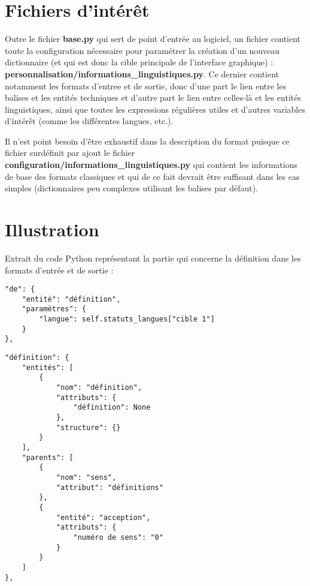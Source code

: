 \documentclass[10pt]{report}
\newcommand{\balise}[1]{\textcolor{red!80}{#1}}
\newcommand{\entité}[1]{\textcolor{blue!60!black}{#1}}
\newcommand{\entitétechnique}[1]{\textcolor{blue!50!red}{#1}}
\begin{document}
\section{Fichiers d’intérêt}

Outre le fichier \textbf{base.py} qui sert de point d’entrée au logiciel, un fichier contient toute la configuration nécessaire pour paramétrer la création d’un nouveau dictionnaire (et qui est donc la cible principale de l’interface graphique) : \textbf{personnalisation/informations\_linguistiques.py}. Ce dernier contient notamment les formats d’entree et de sortie, donc d’une part le lien entre les \balise{balises} et les \entitétechnique{entités techniques} et d’autre part le lien entre \entitétechnique{celles-là} et les \entité{entités linguistiques}, ainsi que toutes les expressions régulières utiles et d’autres variables d’intérêt (comme les différentes langues, etc.).

\bigskip

Il n’est point besoin d’être exhaustif dans la description du format puisque ce fichier surdéfinit par ajout le fichier \textbf{configuration/informations\_linguistiques.py} qui contient les informations de base des formats classiques et qui de ce fait devrait être suffisant dans les cas simples (dictionnaires peu complexes utilisant les balises par défaut).

\section{Illustration}

Extrait du code Python représentant la partie qui concerne la définition dans les formats d’entrée et de sortie :

\begin{verbatim}
"de": {
    "entité": "définition", 
    "paramètres": {
        "langue": self.statuts_langues["cible 1"]
    }
},
\end{verbatim}
\begin{verbatim}
"définition": {
    "entités": [
        {
            "nom": "définition", 
            "attributs": {
                "définition": None
            },
            "structure": {}
        }
    ],
    "parents": [
        {
            "nom": "sens",
            "attribut": "définitions"
        },
        {
            "entité": "acception",
            "attributs": {
                "numéro de sens": "0"
            }
        }
    ]
},
\end{verbatim}
\end{document}
